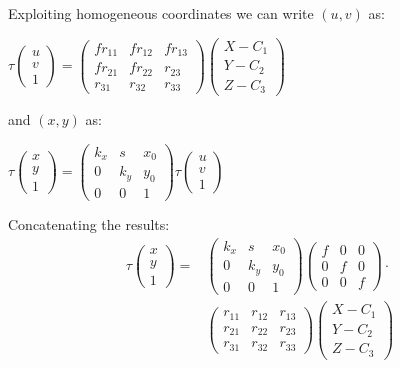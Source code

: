 \documentclass[a4paper, fontsize=8pt, landscape, DIV=1]{scrartcl}
\begin{document}
\begin{multicols*}{4}
		Exploiting homogeneous coordinates we can write $(u,v)$ as:
		\par
		$\tau\begin{pmatrix}u\\v\\1\end{pmatrix}=
		\begin{pmatrix}fr_{11}&fr_{12}&fr_{13}\\fr_{21}&fr_{22}&r_{23}\\r_{31}&r_{32}&r_{33}\end{pmatrix}
		\begin{pmatrix}X-C_1\\Y-C_2\\Z-C_3\end{pmatrix}$
		\par
		and $(x,y)$ as:
		\par 
		$\tau\begin{pmatrix}x\\y\\1\end{pmatrix}=
		\begin{pmatrix}k_x&s&x_0\\0&k_y&y_0\\0&0&1\end{pmatrix}
		\tau\begin{pmatrix}u\\v\\1\end{pmatrix}$
		\par
		Concatenating the results:
		\begin{align*}
			\tau\begin{pmatrix}x\\y\\1\end{pmatrix}=&\begin{pmatrix}k_x&s&x_0\\0&k_y&y_0\\0&0&1\end{pmatrix}
			\begin{pmatrix}f&0&0\\0&f&0\\0&0&f\end{pmatrix}\cdot\\
			&\begin{pmatrix}r_{11}&r_{12}&r_{13}\\r_{21}&r_{22}&r_{23}\\r_{31}&r_{32}&r_{33}\end{pmatrix}
			\begin{pmatrix}X-C_1\\Y-C_2\\Z-C_3\end{pmatrix}

\end{align*}
\end{multicols*}
\end{document}
